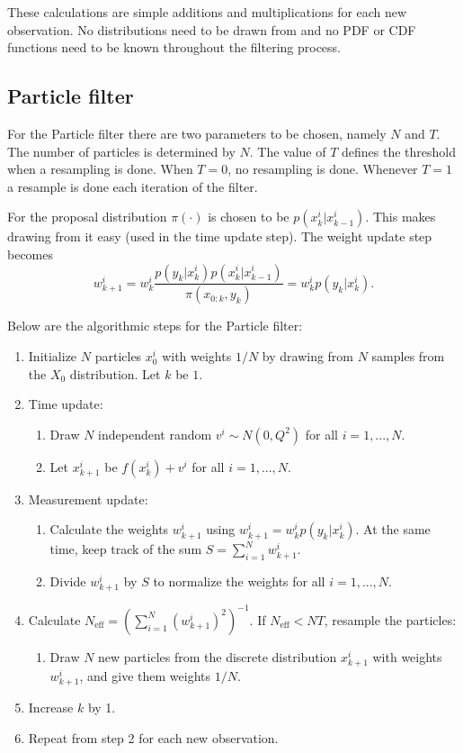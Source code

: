 \documentclass[paper=a4, fontsize=11pt]{scrartcl} %
\numberwithin{equation}{section} %
\numberwithin{figure}{section} %
\numberwithin{table}{section} %
\begin{document}
These calculations are simple additions and multiplications for each new observation. No distributions need to be drawn from and no PDF or CDF functions need to be known throughout the filtering process.

\subsection{Particle filter}

For the Particle filter there are two parameters to be chosen, namely $N$ and $T$. The number of particles is determined by $N$. The value of $T$ defines the threshold when a resampling is done. When $T=0$, no resampling is done. Whenever $T=1$ a resample is done each iteration of the filter. 

For the proposal distribution $\pi(\cdot)$ is chosen to be $p(x_k^i|x_{k-1}^i)$. This makes drawing from it easy (used in the time update step). The weight update step becomes $$
w_{k+1}^i=w_{k}^i\frac{p(y_k|x_k^i)p(x_k^i|x_{k-1}^i)}{\pi(x_{0:k},y_k)}=w_{k}^ip(y_k|x_k^i).
$$

Below are the algorithmic steps for the Particle filter:
\begin{enumerate}
	\item Initialize $N$ particles $x_0^i$ with weights $1/N$ by drawing from $N$ samples from the $X_0$ distribution. Let $k$ be $1$.
	\item Time update:
	\begin{enumerate}
		\item Draw $N$ independent random $v^i \sim N(0,Q^2)$ for all $i=1,...,N$.
		\item Let $x_{k+1}^i$ be $f(x_{k}^i)+v^i$ for all $i=1,...,N$.
	\end{enumerate}
	\item Measurement update: 
	\begin{enumerate}
		\item Calculate the weights $w_{k+1}^i$ using $
	w_{k+1}^i=w_{k}^ip(y_k|x_k^i)$.
	At the same time, keep track of the sum $S = \sum_{i=1}^N w_{k+1}^i$.
		\item Divide $w_{k+1}^i$ by $S$ to normalize the weights for all $i=1,...,N$.
	\end{enumerate}
	\item Calculate $N_\text{eff}=\left(\sum_{i=1}^N \left(w_{k+1}^i\right)^2\right)^{-1}.$ If $N_\text{eff} < NT$, resample the particles:
	\begin{enumerate}
		\item Draw $N$ new particles from the discrete distribution $x_{k+1}^i$ with weights $w_{k+1}^i$, and give them weights $1/N$.
	\end{enumerate}
	\item Increase $k$ by 1.
	\item Repeat from step 2 for each new observation.
\end{enumerate}
\end{document}
